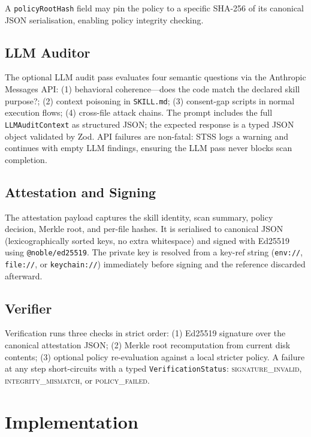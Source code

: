 \documentclass[11pt,twocolumn]{article}
\begin{document}
A \texttt{policyRootHash} field may pin the policy to a specific SHA-256
of its canonical JSON serialisation, enabling policy integrity checking.

\subsection{LLM Auditor}

The optional LLM audit pass evaluates four semantic questions via the
Anthropic Messages API: (1) behavioral coherence---does the code match the
declared skill purpose?; (2) context poisoning in \texttt{SKILL.md};
(3) consent-gap scripts in normal execution flows; (4) cross-file attack
chains. The prompt includes the full \texttt{LLMAuditContext} as structured
JSON; the expected response is a typed JSON object validated by Zod.
API failures are non-fatal: STSS logs a warning and continues with empty LLM
findings, ensuring the LLM pass never blocks scan completion.

\subsection{Attestation and Signing}

The attestation payload captures the skill identity, scan summary, policy
decision, Merkle root, and per-file hashes. It is serialised to canonical
JSON (lexicographically sorted keys, no extra whitespace) and signed with
Ed25519 using \texttt{@noble/ed25519}. The private key is resolved from
a key-ref string (\texttt{env://}, \texttt{file://}, or \texttt{keychain://})
immediately before signing and the reference discarded afterward.

\subsection{Verifier}

Verification runs three checks in strict order: (1) Ed25519 signature
over the canonical attestation JSON; (2) Merkle root recomputation from
current disk contents; (3) optional policy re-evaluation against a local
stricter policy. A failure at any step short-circuits with a typed
\texttt{VerificationStatus}: \textsc{signature\_invalid},
\textsc{integrity\_mismatch}, or \textsc{policy\_failed}.

\section{Implementation}
\label{sec:impl}
\end{document}
